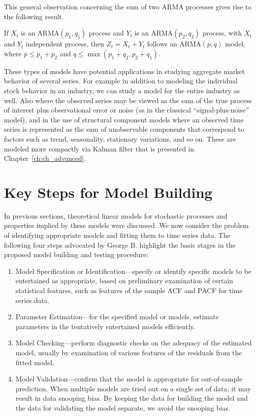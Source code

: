 This general observation concerning the sum of two ARMA processes gives rise to the following result. 


\begin{result}[Aggregation] \label{thm:agg}
If $X_t$ is an ARMA$(p_1,q_1)$ process and $Y_t$ is an ARMA$(p_2, q_2)$ process, with $X_t$ and $Y_t$ independent process, then $Z_t = X_t + Y_t$ follows an ARMA$(p,q)$ model, where $p \leq p_1 + p_2$ and $q \leq \max(p_1 + q_2, p_2 + q_1)$.
\end{result}


These types of models have potential applications in studying aggregate market behavior of several series. For example in addition to modeling the individual stock behavior in an industry, we can study a model for the entire industry as well. Also where the observed series may be viewed as the sum of the true process of interest plus observational error or noise (as in the classical ``signal-plus-noise'' model), and in the use of structural component models where an observed time series is represented as the sum of unobservable components that correspond to factors such as trend, seasonality, stationary variations, and so on. These are modeled more compactly via Kalman filter that is presented in Chapter~\ref{ch:ch_advanced}. 



\section{Key Steps for Model Building \label{sec:key_step}}

In previous sections, theoretical linear models for stochastic processes and properties implied by these models were discussed. We now consider the problem of identifying appropriate models and fitting them to time series data. The following four steps advocated by George B. highlight the basic stages in the proposed model building and testing procedure:

\begin{enumerate}
\item Model Specification or Identification---specify or identify specific models to be entertained as appropriate, based on preliminary examination of certain statistical features, such as features of the sample ACF and PACF for time series data.

\item Parameter Estimation---for the specified model or models, estimate parameters in the tentatively entertained models efficiently.

\item Model Checking---perform diagnostic checks on the adequacy of the estimated model, usually by examination of various features of the residuals from the fitted model.

\item Model Validation---confirm that the model is appropriate for out-of-sample prediction. When multiple models are tried out on a single set of data, it may result in data snooping bias. By keeping the data for building the model and the data for validating the model separate, we avoid the snooping bias.
\end{enumerate}


